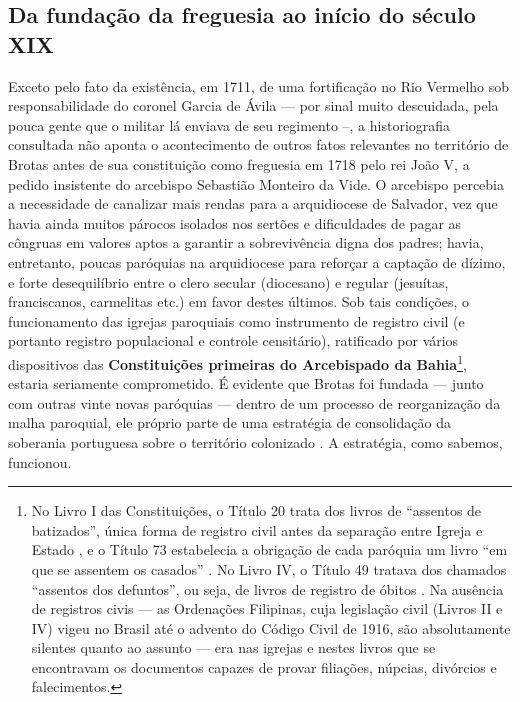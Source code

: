 \subsection{Da fundação da freguesia ao início do século XIX}

Exceto pelo fato da existência, em 1711, de uma fortificação no Rio Vermelho sob responsabilidade do coronel Garcia de Ávila --- por sinal muito descuidada, pela pouca gente que o militar lá enviava de seu regimento \cite[p. 99]{cabral_manuscritos_1883} --, a historiografia consultada não aponta o acontecimento de outros fatos relevantes no território de Brotas antes de sua constituição como freguesia em 1718 pelo rei João V, a pedido insistente do arcebispo Sebastião Monteiro da Vide. O arcebispo percebia a necessidade de canalizar mais rendas para a arquidiocese de Salvador, vez que havia ainda muitos párocos isolados nos sertões e dificuldades de pagar as côngruas em valores aptos a garantir a sobrevivência digna dos padres; havia, entretanto, poucas paróquias na arquidiocese para reforçar a captação de dízimo, e forte desequilíbrio entre o clero secular (diocesano) e regular (jesuítas, franciscanos, carmelitas etc.) em favor destes últimos. Sob tais condições, o funcionamento das igrejas paroquiais como instrumento de registro civil (e portanto registro populacional e controle censitário), ratificado por vários dispositivos das \textbf{Constituições primeiras do Arcebispado da Bahia}\footnote{No Livro I das Constituições, o Título 20 trata dos livros de ``assentos de batizados'', única forma de registro civil antes da separação entre Igreja e Estado \cite[pp.~28-31]{vide_const_2007}, e o Título 73 estabelecia a obrigação de cada paróquia um livro ``em que se assentem os casados'' \cite[pp.~130-131]{vide_const_2007}. No Livro IV, o Título 49 tratava dos chamados ``assentos dos defuntos'', ou seja, de livros de registro de óbitos \cite[pp.~292-293]{vide_const_2007}. Na ausência de registros civis --- as Ordenações Filipinas, cuja legislação civil (Livros II e IV) vigeu no Brasil até o advento do Código Civil de 1916, são absolutamente silentes quanto ao assunto --- era nas igrejas e nestes livros que se encontravam os documentos capazes de provar filiações, núpcias, divórcios e falecimentos.}, estaria seriamente comprometido. É evidente que Brotas foi fundada --- junto com outras vinte novas paróquias --- dentro de um processo de reorganização da malha paroquial, ele próprio parte de uma estratégia de consolidação da soberania portuguesa sobre o território colonizado \cite[pp.~26-30]{vivas_botelho_2011}. A estratégia, como sabemos, funcionou.

